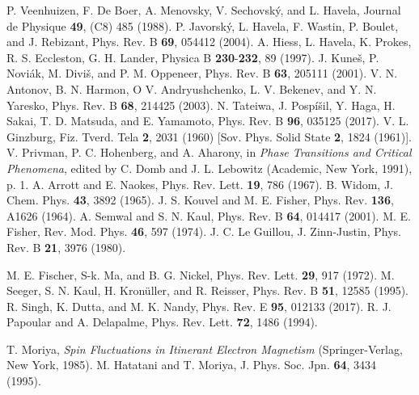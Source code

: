 \documentclass[twocolumn,showpacs,preprintnumbers,amsmath,amssymb]{revtex4}
\begin{document}
\begin{references}
  P. Veenhuizen, F. De Boer, A. Menovsky, V. Sechovsk\'y, and L. Havela, Journal de Physique {\bf 49}, (C8) 485 (1988).%
  P. Javorsk{\'y}, L. Havela, F. Wastin, P. Boulet, and J. Rebizant, Phys. Rev. B {\bf 69}, 054412 (2004).   %
    A. Hiess, L. Havela, K. Prokes, R. S. Eccleston, G. H. Lander, Physica B {\bf 230}-{\bf 232}, 89 (1997).   %
 J. Kune{\v{s}}, P. Novi{\'a}k, M. Divi{\v{s}}, and P. M. Oppeneer, Phys. Rev. B {\bf 63}, 205111 (2001).  %
 V. N. Antonov, B. N. Harmon, O V. Andryushchenko, L. V. Bekenev, and Y. N. Yaresko, Phys. Rev. B {\bf 68}, 214425 (2003).%
N. Tateiwa, J. Posp{\'i}\v{s}il, Y. Haga, H. Sakai, T. D. Matsuda, and E. Yamamoto, Phys. Rev. B {\bf 96}, 035125 (2017).
  V. L. Ginzburg, Fiz. Tverd. Tela {\bf 2}, 2031 (1960) [Sov. Phys. Solid State {\bf 2}, 1824 (1961)]. 
 V. Privman, P. C. Hohenberg, and A. Aharony, in {\it Phase Transitions and Critical Phenomena}, edited by C. Domb and J. L. Lebowitz (Academic, New York, 1991), p. 1.
A. Arrott and E. Naokes, Phys. Rev. Lett. {\bf 19}, 786 (1967). 
 B. Widom, J. Chem. Phys. {\bf 43}, 3892 (1965). 
 J. S. Kouvel and M. E. Fisher, Phys. Rev. {\bf 136}, A1626 (1964). 
 A. Semwal and S. N. Kaul, Phys. Rev. B  {\bf 64}, 014417 (2001). 
M. E. Fisher, Rev. Mod. Phys. {\bf 46}, 597 (1974).
J. C. Le Guillou, J. Zinn-Justin, Phys. Rev. B {\bf 21}, 3976 (1980).

 M. E. Fischer, S-k. Ma, and B. G. Nickel, Phys. Rev. Lett. {\bf 29}, 917 (1972). 
M. Seeger, S. N. Kaul, H. Kron{\"{u}}ller, and R. Reisser, Phys. Rev. B {\bf 51}, 12585 (1995).%
R. Singh, K. Dutta, and M. K. Nandy, Phys. Rev. E {\bf 95}, 012133 (2017).
R. J. Papoular and A. Delapalme, Phys. Rev. Lett. {\bf 72}, 1486 (1994). %

 T. Moriya, {\it Spin Fluctuations in Itinerant Electron Magnetism} (Springer-Verlag, New York, 1985).
M. Hatatani and T. Moriya, J. Phys. Soc. Jpn. {\bf 64}, 3434 (1995).

    \end{references}
\end{document}
